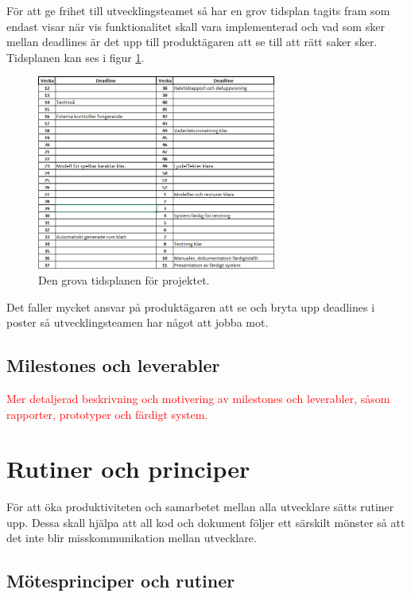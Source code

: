 \documentclass[a4paper,12pt,oneside,final]{extbook}
\begin{document}
För att ge frihet till utvecklingsteamet så har en grov tidsplan tagits fram som endast visar när vis funktionalitet skall vara implementerad och vad som sker mellan deadlines är det upp till produktägaren att se till att rätt saker sker.  Tidsplanen kan ses i figur \ref{fig:tidsplan}.

\begin{figure}[H]
	\includegraphics[width=0.7\textwidth, center]{tidsplan.jpg}
	\caption{Den grova tidsplanen för projektet.}
	\label{fig:tidsplan}
\end{figure}
Det faller mycket ansvar på produktägaren att se och bryta upp deadlines i poster så utvecklingsteamen har något att jobba mot.


\section{Milestones och leverabler}

\textcolor{red}{Mer detaljerad beskrivning och motivering av milestones och leverabler, såsom rapporter, prototyper
och färdigt system.
}


\chapter{Rutiner och principer}

För att öka produktiviteten och samarbetet mellan alla utvecklare sätts rutiner upp. Dessa skall hjälpa att all kod och dokument följer ett särskilt mönster så att det inte blir misskommunikation mellan utvecklare.

\section{Mötesprinciper och rutiner}
\end{document}
